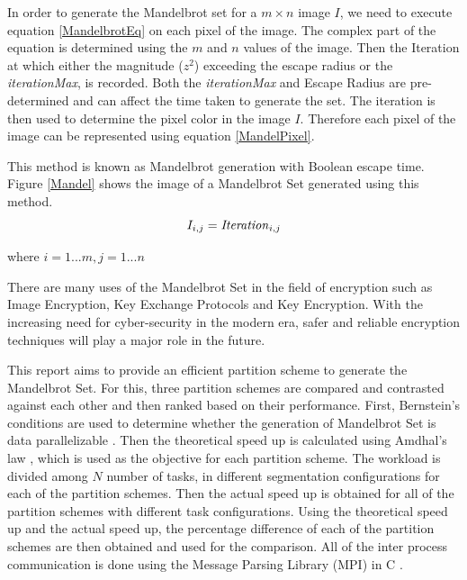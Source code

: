 \documentclass[conference]{IEEEtran}
\begin{document}
	In order to generate the Mandelbrot set for a $m \times n$ image $I$, we need to execute equation \ref{MandelbrotEq} on each pixel of the image. The complex part of the equation is determined using the $m$ and $n$ values of the image. Then the Iteration at which either the magnitude ($z^2$) exceeding the escape radius or the \textit{iterationMax}, is recorded. Both the \textit{iterationMax} and Escape Radius are pre-determined and can affect the time taken to generate the set. The iteration is then used to determine the pixel color in the image $I$. Therefore each pixel of the image can be represented using equation \ref{MandelPixel}. 
	
	This method is known as Mandelbrot generation with Boolean escape time. Figure \ref{Mandel} shows the image of a Mandelbrot Set generated using this method.
			\begin{equation}
	I_{i,j} = \text{\emph{Iteration}}_{i,j}  \label{MandelPixel}
	\end{equation}
	\begin{center}
		where $i = 1...m, j = 1...n$
	\end{center}
	


	There are many uses of the Mandelbrot Set in the field of encryption such as Image Encryption\cite{Iencryption}, Key Exchange Protocols \cite{alia2007new} and Key Encryption\cite{agarwal2017symmetric}. With the increasing need for cyber-security in the modern era, safer and reliable encryption techniques will play a major role in the future.
 	
	This report aims to provide an efficient partition scheme to generate the Mandelbrot Set. For this, three partition schemes are compared and contrasted against each other and then ranked based on their performance. 
	First, Bernstein's conditions are used to determine whether the generation of Mandelbrot Set is data parallelizable \cite{bernstein1996analysis}. Then the theoretical speed up is calculated using Amdhal's law \cite{amdahl1967validity}, which is used as the objective for each partition scheme.  The workload is divided among $N$ number of tasks, in different segmentation configurations for each of the partition schemes. Then the actual speed up is obtained for all of the partition schemes with different task configurations. Using the theoretical speed up and the actual speed up, the percentage difference of each of the partition schemes are then obtained and used for the comparison. All of the inter process communication is done using the Message Parsing Library (MPI) in C \cite{openmpi}.
\end{document}
